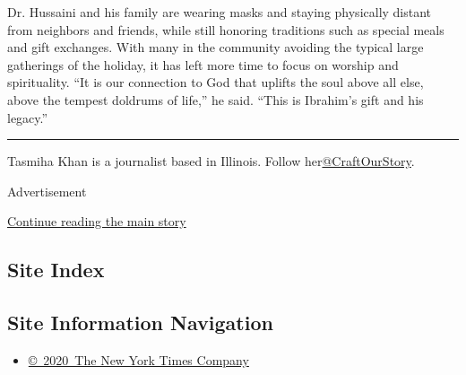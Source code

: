Dr. Hussaini and his family are wearing masks and staying physically
distant from neighbors and friends, while still honoring traditions such
as special meals and gift exchanges. With many in the community avoiding
the typical large gatherings of the holiday, it has left more time to
focus on worship and spirituality. ``It is our connection to God that
uplifts the soul above all else, above the tempest doldrums of life,''
he said. ``This is Ibrahim's gift and his legacy.''

\begin{center}\rule{0.5\linewidth}{\linethickness}\end{center}

Tasmiha Khan is a journalist based in Illinois. Follow
her\href{https://twitter.com/CraftOurStory}{@CraftOurStory}.

Advertisement

\protect\hyperlink{after-bottom}{Continue reading the main story}

\hypertarget{site-index}{%
\subsection{Site Index}\label{site-index}}

\hypertarget{site-information-navigation}{%
\subsection{Site Information
Navigation}\label{site-information-navigation}}

\begin{itemize}
\tightlist
\item
  \href{https://help.nytimes.com/hc/en-us/articles/115014792127-Copyright-notice}{©~2020~The
  New York Times Company}
\end{itemize}


